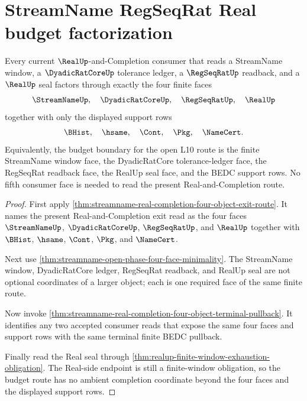 \section{StreamName RegSeqRat Real budget factorization}
\label{sec:streamname-regseqrat-real-budget-factorization}

\begin{theorem}
\label{thm:streamname-regseqrat-real-budget-factorization}
Every current $\RealUp$-and-Completion consumer that reads a StreamName window, a $\DyadicRatCoreUp$ tolerance ledger, a $\RegSeqRatUp$ readback, and a $\RealUp$ seal factors through exactly the four finite faces
$$
\StreamNameUp,\quad \DyadicRatCoreUp,\quad \RegSeqRatUp,\quad \RealUp
$$
together with only the displayed support rows
$$
\BHist,\quad \hsame,\quad \Cont,\quad \Pkg,\quad \NameCert.
$$
Equivalently, the budget boundary for the open L10 route is the finite StreamName window face, the DyadicRatCore tolerance-ledger face, the RegSeqRat readback face, the RealUp seal face, and the BEDC support rows. No fifth consumer face is needed to read the present Real-and-Completion route.
\end{theorem}
\begin{proof}
First apply \autoref{thm:streamname-real-completion-four-object-exit-route}. It names the present Real-and-Completion exit read as the four faces $\StreamNameUp$, $\DyadicRatCoreUp$, $\RegSeqRatUp$, and $\RealUp$ together with $\BHist$, $\hsame$, $\Cont$, $\Pkg$, and $\NameCert$.

Next use \autoref{thm:streamname-open-phase-four-face-minimality}. The StreamName window, DyadicRatCore ledger, RegSeqRat readback, and RealUp seal are not optional coordinates of a larger object; each is one required face of the same finite route.

Now invoke \autoref{thm:streamname-real-completion-four-object-terminal-pullback}. It identifies any two accepted consumer reads that expose the same four faces and support rows with the same terminal finite BEDC pullback.

Finally read the Real seal through \autoref{thm:realup-finite-window-exhaustion-obligation}. The Real-side endpoint is still a finite-window obligation, so the budget route has no ambient completion coordinate beyond the four faces and the displayed support rows.
\end{proof}

